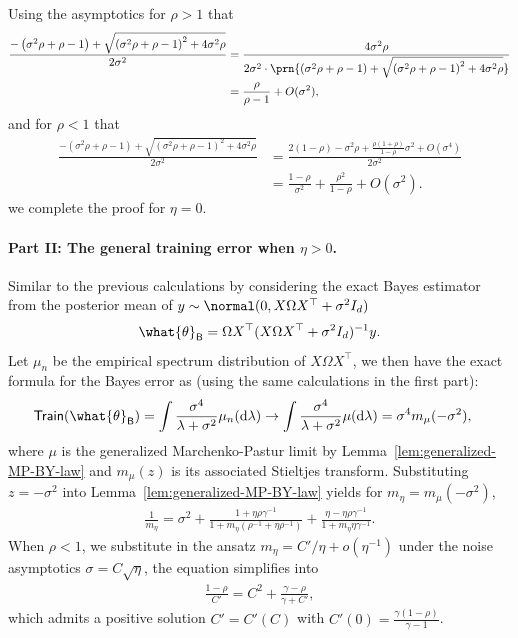 \documentclass[11pt]{article}
\newcommand{\bysest}{\what{\theta}_{\mathsf{B}}}
\newcommand{\trerr}{\mathsf{Train}}
\newcommand{\de}{\mathrm{d}}
\begin{document}
Using the asymptotics for $\rho > 1$ that
\begin{align*}
    \frac{-\left(\sigma^2 \rho + \rho - 1\right) + \sqrt{\left(\sigma^2 \rho + \rho - 1\right)^2+4 \sigma^2 \rho}}{2 \sigma^2} & = \frac{4\sigma^2 \rho}{2 \sigma^2 \cdot \prn{\left(\sigma^2 \rho + \rho - 1\right) + \sqrt{\left(\sigma^2 \rho + \rho - 1\right)^2+4 \sigma^2 \rho}}} \nonumber \\
    & = \frac{\rho}{\rho-1} + O(\sigma^2),
\end{align*}
and for $\rho < 1$ that
\begin{align*}
    \frac{-\left(\sigma^2 \rho + \rho - 1\right) + \sqrt{\left(\sigma^2 \rho + \rho - 1\right)^2+4 \sigma^2 \rho}}{2 \sigma^2} & = \frac{2(1-\rho) -\sigma^2 \rho + \frac{\rho(1+\rho)}{1-\rho} \sigma^2 + O(\sigma^4)}{2 \sigma^2} \nonumber \\
    & = \frac{1-\rho}{\sigma^2} + \frac{\rho^2}{1-\rho} + O(\sigma^2).
\end{align*}
we complete the proof for $\eta = 0$.
\paragraph{Part II: The general training error when $\eta > 0$.} Similar to the previous calculations by considering the exact Bayes estimator from the posterior mean of $y \sim \normal(0, X\Omega X^\top + \sigma^2 I_d)$
\begin{align*}
\bysest = \Omega X^\top (X \Omega X^\top+\sigma^2 I_d)^{-1} y.
\end{align*}
Let $\mu_n$ be the empirical spectrum distribution of $X \Omega X^\top$, we then have the exact formula for the Bayes error as (using the same calculations in the first part):
\begin{align*}
    \trerr(\bysest) & = \int \frac{\sigma^4}{\lambda + \sigma^2} \mu_n(\de \lambda) \to \int \frac{\sigma^4}{\lambda + \sigma^2} \mu(\de \lambda) = \sigma^4 m_\mu(-\sigma^2),
\end{align*}
where $\mu$ is the generalized Marchenko-Pastur limit by Lemma~\ref{lem:generalized-MP-BY-law} and $m_\mu(z)$ is its associated Stieltjes transform. Substituting $z = -\sigma^2$ into Lemma~\ref{lem:generalized-MP-BY-law} yields for $m_{\eta} = m_\mu(-\sigma^2)$,
\begin{align*}
    \frac{1}{m_\eta} = \sigma^2 + \frac{1 + \eta \rho \gamma^{-1}}{1 +  m_\eta (\rho^{-1} + \eta \rho^{-1})} + \frac{\eta - \eta \rho \gamma^{-1}}{1 + m_\eta \eta \gamma^{-1}}.
\end{align*}
When $\rho<1$, we substitute in the ansatz $m_\eta = C'/\eta + o(\eta^{-1})$ under the noise asymptotics $\sigma = C \sqrt{\eta}$, the equation simplifies into
\begin{align*}
    \frac{1-\rho}{C'}=C^2+\frac{\gamma-\rho}{\gamma+C'},
\end{align*}
which admits a positive solution $C'=C'(C)$ with $C'(0)= \frac{\gamma(1-\rho)}{\gamma-1}$.
\end{document}
